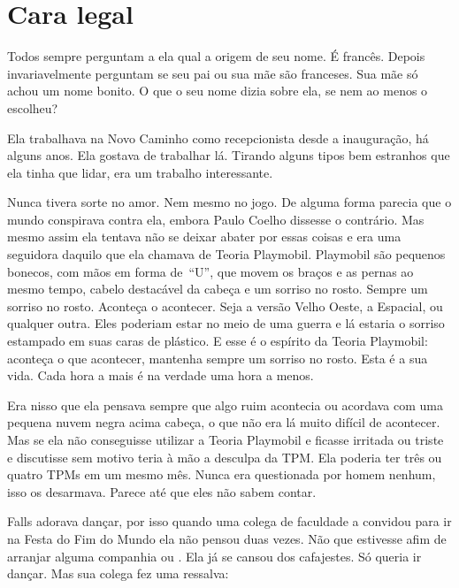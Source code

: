 \chapter{Cara legal}

Todos sempre perguntam a ela qual a origem de seu nome. É francês. Depois invariavelmente perguntam se seu pai ou sua mãe são franceses. Sua mãe só achou um nome bonito. O que o seu nome dizia sobre ela, se nem ao menos o escolheu?

Ela trabalhava na Novo Caminho como recepcionista desde a inauguração, há alguns anos. Ela gostava de trabalhar lá. Tirando alguns tipos bem estranhos que ela tinha que lidar, era um trabalho interessante.

Nunca tivera sorte no amor. Nem mesmo no jogo. De alguma forma\mudanca{,} parecia que o mundo conspirava contra ela, embora Paulo Coelho dissesse o contrário. Mas\mudanca{,} mesmo assim\mudanca{,} ela tentava não se deixar abater por essas coisas\mudanca{,} e era uma seguidora daquilo que ela chamava de Teoria Playmobil. Playmobil são pequenos bonecos, com mãos em forma de~``U'', que movem os braços e as pernas ao mesmo tempo, cabelo destacável da cabeça e um sorriso no rosto. Sempre um sorriso no rosto. Aconteça o acontecer. Seja a versão Velho Oeste, a Espacial,  ou qualquer outra. Eles poderiam estar no meio de uma guerra\mudanca{,} e lá estaria o sorriso estampado em suas caras de plástico. E esse é o espírito da Teoria Playmobil: aconteça o que acontecer, mantenha sempre um sorriso no rosto. Esta é a sua vida. Cada hora a mais é na verdade uma hora a menos.

Era nisso que ela pensava sempre que algo ruim acontecia ou acordava com uma pequena nuvem negra acima  cabeça, o que não era lá muito difícil de acontecer. Mas se ela não conseguisse utilizar a Teoria Playmobil e ficasse irritada ou triste e discutisse sem motivo teria à mão a desculpa da TPM. Ela poderia ter três ou quatro TPMs em um mesmo mês. Nunca era questionada por homem nenhum, isso os desarmava. Parece até que eles não sabem contar.

Falls adorava dançar, por isso\mudanca{,} quando uma colega de faculdade a convidou para ir na Festa do Fim do Mundo\mudanca{,} ela não pensou duas vezes. Não que estivesse afim de arranjar alguma companhia ou . Ela já se cansou dos cafajestes. Só queria ir dançar. Mas sua colega fez uma ressalva:

